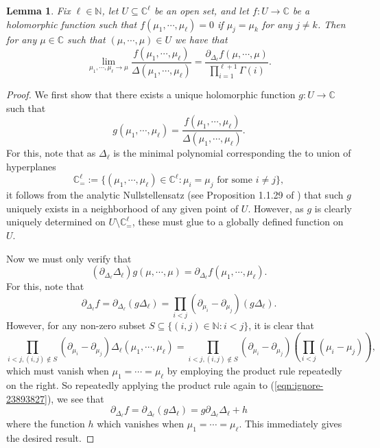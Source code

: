 \documentclass[12pt]{article}
\newcommand{\N}{\mathbb{N}}
\newcommand{\C}{\mathbb{C}}
\newtheorem{lem}[info]{Lemma}
\numberwithin{info}{section}
\numberwithin{equation}{section}
\renewcommand{\[}{\begin{equation}}
\renewcommand{\]}{\end{equation}}
\newcommand{\<}{\langle}
\renewcommand{\>}{\rangle}
\begin{document}
	\begin{lem}
		\label{lem:abstract-nonsense complex analysis}
		Fix $\ell\in \N$, let $U\subseteq \C^\ell$ be an open set, and let $f:U\to \C$ be a holomorphic function such that $f(\mu_1,\cdots, \mu_\ell)=0$ if $\mu_j=\mu_k$ for any $j\neq k$. Then for any $\mu\in \C$ such that $(\mu,\cdots,\mu)\in U$ we have that
		\[\lim_{\mu_1,\cdots ,\mu_\ell\to \mu}\frac{f(\mu_1,\cdots,\mu_\ell)}{\Delta(\mu_1,\cdots,\mu_\ell)}=\frac{\partial_{\Delta_\ell}f(\mu,\cdots,\mu)}{\prod_{i=1}^{\ell+1}\Gamma(i)}.\]
	\end{lem}
	\begin{proof}
		We first show that there exists a unique holomorphic function $g:U\to \C$ such that
		\[g(\mu_1,\cdots,\mu_\ell)=\frac{f(\mu_1,\cdots,\mu_\ell)}{\Delta(\mu_1,\cdots,\mu_\ell)}.\label{eqn:division by Vandermonde}\]
		For this, note that as $\Delta_\ell$ is the minimal polynomial corresponding the to union of hyperplanes
		\[\C^{\ell}_{=}:=\{(\mu_1,\cdots, \mu_\ell)\in \C^\ell: \mu_i=\mu_j \text{ for some }i\neq j\},\]
		it follows from the analytic Nullstellensatz (see Proposition 1.1.29 of \cite{complex-geo}) that such $g$ uniquely exists in a neighborhood of any given point of $U$. However, as $g$ is clearly uniquely determined on $U\setminus \C^{\ell}_{=}$, these must glue to a globally defined function on $U$.
		
		Now we must only verify that
		\[\left(\partial_{\Delta_\ell}\Delta_\ell\right)g(\mu,\cdots,\mu)=\partial_{\Delta_\ell}f(\mu_1,\cdots,\mu_\ell).\]
		For this, note that
		\[\partial_{\Delta_\ell}f=\partial_{\Delta_\ell}\left(g\Delta_{\ell}\right)=\prod_{i<j}\left(\partial_{\mu_i}-\partial_{\mu_j}\right)\left(g\Delta_{\ell}\right).\label{eqn:ignore-23893827}\]
		However, for any non-zero subset $S\subseteq \{(i,j)\in \N: i<j\}$, it is clear that
		\[\prod_{i<j,(i,j)\notin S}\left(\partial_{\mu_i}-\partial_{\mu_j}\right)\Delta_{\ell}(\mu_1,\cdots,\mu_\ell)=\prod_{i<j,(i,j)\notin S}\left(\partial_{\mu_i}-\partial_{\mu_j}\right)\left(\prod_{i<j}\left(\mu_i-\mu_j\right)\right),\]
		which must vanish when $\mu_1=\cdots=\mu_\ell$ by employing the product rule repeatedly on the right. So repeatedly applying the product rule again to (\ref{eqn:ignore-23893827}), we see that
		\[\partial_{\Delta_{\ell}}f=\partial_{\Delta_\ell} (g\Delta_\ell)=g\partial_{\Delta_\ell}\Delta_\ell+h\]
		where the function $h$ which vanishes when $\mu_1=\cdots =\mu_\ell$. This immediately gives the desired result.
	\end{proof}
	
\end{document}
